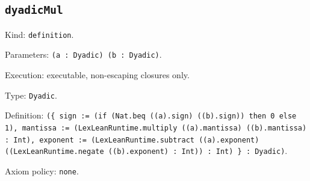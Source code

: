 \documentclass[11pt]{article}
\begin{document}
\subsection*{\texttt{dyadicMul}}
\noindent Kind: \texttt{definition}.\par
\noindent Parameters: \texttt{(a : Dyadic) (b : Dyadic)}.\par
\noindent Execution: executable, non-escaping closures only.\par
\noindent Type: \texttt{Dyadic}.\par
\noindent Definition: \texttt{(\{ sign := (if (Nat.beq ((a).sign) ((b).sign)) then 0 else 1), mantissa := (LexLeanRuntime.multiply ((a).mantissa) ((b).mantissa) : Int), exponent := (LexLeanRuntime.subtract ((a).exponent) ((LexLeanRuntime.negate ((b).exponent) : Int)) : Int) \} : Dyadic)}.\par
\noindent Axiom policy: \texttt{none}.\par
\end{document}
